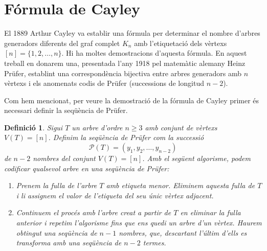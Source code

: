 \documentclass{article}
\newtheorem{definition}{Definició}[section]
\begin{document}
\section{Fórmula de Cayley}
El 1889 Arthur Cayley va establir una fórmula per determinar el nombre d'arbres generadors diferents del graf complet $K_n$ amb l'etiquetació dels vèrtexs $[n] = \{1,2,\dots ,n\}$. Hi ha moltes demostracions d'aquesta fórmula. En aquest treball en donarem una, presentada l'any 1918 pel matemàtic alemany Heinz Prüfer, establint una correspondència bijectiva entre arbres generadors amb $n$ vèrtexs i els anomenats codis de Prüfer (successions de longitud $n-2$). \cite{5}\par
Com hem mencionat, per veure la demostració de la fórmula de Cayley primer és necessari definir la seqüència de Prüfer.
\begin{definition}\label{pruf}
    Sigui $T$ un arbre d'ordre $n \geq 3$ amb conjunt de vèrtexs $V(T)= [n]$. Definim la seqüència de Prüfer com la successió
    $$\mathcal{P}(T)=(y_1,y_2,\ldots,y_{n-2})$$
    de $n-2$ nombres del conjunt $V(T)=[n]$. Amb el següent algorisme, podem codificar qualsevol arbre en una seqüència de Prüfer:
    \begin{enumerate}
        \item Prenem la fulla de l'arbre $T$ amb etiqueta menor. Eliminem aquesta fulla de $T$ i li assignem el valor de l'etiqueta del seu únic vèrtex adjacent.
        \item Continuem el procés amb l'arbre creat a partir de $T$ en eliminar la fulla anterior i repetim l'algorisme fins que ens quedi un arbre d'un vèrtex. Haurem obtingut una seqüència de $n-1$ nombres, que, descartant l'últim d'ells es transforma amb una seqüència de $n-2$ termes. \cite{4}
    \end{enumerate}
\end{definition}
\end{document}

